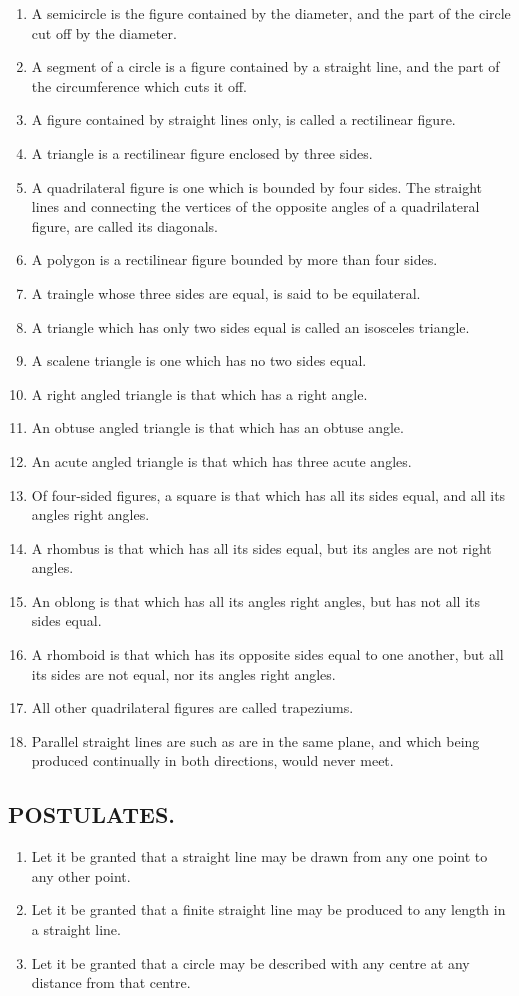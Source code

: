 \begin{enumerate}[I]
			\item A semicircle is the figure contained by the diameter, and the part of the circle cut off by the diameter.
			\item A segment of a circle is a figure contained by a straight line, and the part of the circumference which cuts it off. 
			\item A figure contained by straight lines only, is called a rectilinear figure. 
			\item A triangle is a rectilinear figure enclosed by three sides. 
			\item A quadrilateral figure is one which is bounded by four sides. The straight lines and connecting the vertices of the opposite angles of a quadrilateral figure, are called its diagonals. 
			\item A polygon is a rectilinear figure bounded by more than four sides. 
			\item A traingle whose three sides are equal, is said to be equilateral. 
			\item A triangle which has only two sides equal is called an isosceles triangle. 
			\item A scalene triangle is one which has no two sides equal. 
			\item A right angled triangle is that which has a right angle. 
			\item An obtuse angled triangle is that which has an obtuse angle. 
			\item An acute angled triangle is that which has three acute angles. 
			\item Of four-sided figures, a square is that which has all its sides equal, and all its angles right angles. 
			\item A rhombus is that which has all its sides equal, but its angles are not right angles. 
			\item An oblong is that which has all its angles right angles, but has not all its sides equal. 
			\item A rhomboid is that which has its opposite sides equal to one another, but all its sides are not equal, nor its angles right angles. 
			\item All other quadrilateral figures are called trapeziums.
			\item Parallel straight lines are such as are in the same plane, and which being produced continually in both directions, would never meet. 
		\end{enumerate}
		\centering\subsection*{POSTULATES.}
		\begin{enumerate}[I]
			\item Let it be granted that a straight line may be drawn from any one point to any other point.
			\item Let it be granted that a finite straight line may be produced to any length in a straight line. 
			\item Let it be granted that a circle may be described with any centre at any distance from that centre. 
		\end{enumerate}
		
